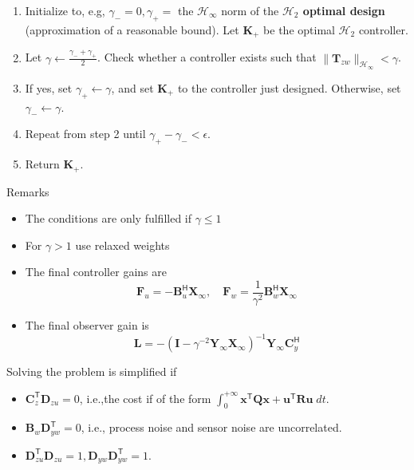 \begin{enumerate}
    \item Initialize to, e.g, $\gamma_-=0,\gamma_+=$ the $\mathcal{H}_\infty$ norm of the \textbf{$\mathcal{H}_2$ optimal design} (approximation of a reasonable bound). Let $\mathbf{K}_+$ be the optimal $\mathcal{H}_2$ controller.
    \item Let $\gamma\gets \frac{\gamma_-+\gamma_+}{2}$. Check whether a controller exists such that $\|\mathbf{T}_{zw}\|_{\mathcal{H}_\infty}<\gamma$.
    \item If yes, set $\gamma_+\leftarrow\gamma$, and set $\mathbf{K}_+$ to the controller just designed. Otherwise, set $\gamma_-\leftarrow\gamma$.
    \item Repeat from step 2 until $\gamma_+-\gamma_-<\epsilon$.
    \item Return $\mathbf{K}_+$.
\end{enumerate}
\newpar{}
Remarks
\begin{itemize}
    \item The conditions are only fulfilled if $\gamma\le 1$
    \item For $\gamma>1$ use relaxed weights
    \item The final controller gains are 
    \begin{equation*}
        \mathbf{F}_u=-\mathbf{B}_u^{\mathsf{H}}\mathbf{X}_\infty,\quad \mathbf{F}_w=\frac1{\gamma^2}\mathbf{B}_w^{\mathsf{H}}\mathbf{X}_\infty 
    \end{equation*}
    \item The final observer gain is 
    \begin{equation*}
        \mathbf{L}=-{(\mathbf{I}-\gamma^{-2}\mathbf{Y}_\infty \mathbf{X}_\infty)}^{-1}\mathbf{Y}_\infty \mathbf{C}_y^{\mathsf{H}}
    \end{equation*}
\end{itemize}

\newpar{}

Solving the problem is simplified if
\begin{itemize}
    \item $\mathbf{C}_{z}^{\mathsf{T}}\mathbf{D}_{zu}=0$, i.e.,the cost if of the form $\int_0^{+\infty}\mathbf{x}^{\mathsf{T}}\mathbf{Q}\mathbf{x}+\mathbf{u}^{\mathsf{T}}\mathbf{R}\mathbf{u}\;dt$.
    \item $\mathbf{B}_w \mathbf{D}_{yw}^{\mathsf{T}}=0$, i.e., process noise and sensor noise are uncorrelated.
    \item $\mathbf{D}_{zu}^{\mathsf{T}}\mathbf{D}_{zu}=1,\mathbf{D}_{yw}\mathbf{D}_{yw}^{\mathsf{T}}=1$.
\end{itemize}

